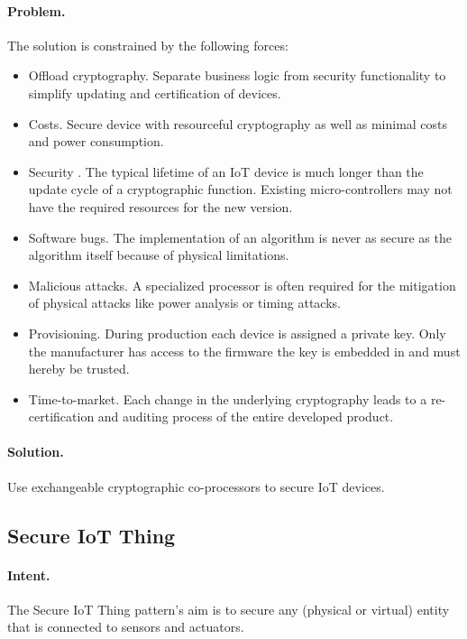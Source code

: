 \paragraph{\textbf{Problem.}} The solution is constrained by the following forces:

\begin{itemize}
	\item Offload cryptography. Separate business logic from security functionality to simplify updating and certification of devices.
	\item Costs. Secure device with resourceful cryptography as well as minimal costs and power consumption. 
	\item Security . The typical lifetime of an IoT device is much longer than the update cycle of a cryptographic function. Existing micro-controllers may not have the required resources for the new version.
	\item Software bugs. The implementation of an algorithm is never as secure as the algorithm itself because of physical limitations. 
	\item Malicious attacks. A specialized processor is often required for the mitigation of physical attacks like power analysis or timing attacks.
	\item Provisioning. During production each device is assigned a private key. Only the manufacturer has access to the firmware the key is embedded in and must hereby be trusted.
	\item Time-to-market. Each change in the underlying cryptography leads to a re-certification and auditing process of the entire developed product.
\end{itemize}

\paragraph{\textbf{Solution.}} Use exchangeable cryptographic co-processors to secure IoT devices.


\subsection{Secure IoT Thing~\cite{Fernandez2021}} 
\label{p:thing}

\paragraph{\textbf{Intent.}} The Secure IoT Thing pattern's aim is to secure any (physical or virtual) entity that is connected to sensors and actuators.

